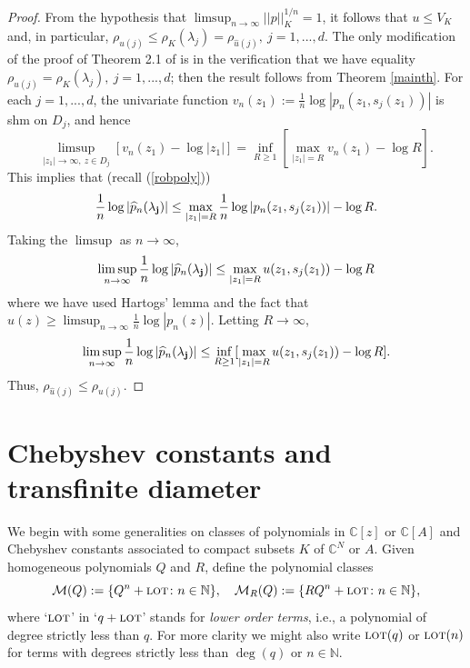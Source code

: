 \documentclass[12pt]{article}
\numberwithin{equation}{section}
\newcommand{\C}{\mathbb{C}}
\newcommand{\N}{\mathbb{N}}
\renewcommand{\hat}{\widehat}
\newcommand{\calM}{\mathcal{M}}
\newcommand{\lot}{\text{\sc lot}}
\begin{document}
\begin{proof} From the hypothesis that $\limsup_{n\to \infty} ||p||_K^{1/n}=1$, it follows that $u\leq V_K$ and, in particular, $\rho_{u(j)}\leq \rho_K(\lambda_j)=\rho_{\hat u(j)}, \ j=1,...,d$. The only modification of the proof of Theorem 2.1 of \cite{B98} is in the verification that we have equality $\rho_{u(j)}= \rho_K(\lambda_j), \ j=1,...,d$; then the result follows from Theorem \ref{mainth}. For each $j=1,...,d$, the univariate function $v_n(z_1):=\frac{1}{n}\log |p_n(z_1,s_j(z_1))|$ is shm on $D_j$, and hence
$$\limsup_{|z_1|\to \infty, \ z\in D_j} [v_n(z_1)-\log |z_1|]=\inf_{R\geq 1}[\max_{|z_1|=R}v_n(z_1)-\log R].$$
This implies that (recall (\ref{robpoly}))
$$\frac{1}{n}\log |\hat p_n({\bf{\lambda_j}})|\leq \max_{|z_1|=R}\frac{1}{n}\log |p_n(z_1,s_j(z_1))|-\log R.$$
Taking the $\limsup$ as $n\to \infty$,   
$$\limsup_{n\to \infty} \frac{1}{n}\log |\hat p_n({\bf{\lambda_j}})|\leq \max_{|z_1|=R} u(z_1,s_j(z_1))-\log R$$
where we have used Hartogs' lemma and the fact that $u(z)\geq \limsup_{n\to \infty}\frac{1}{n}\log |p_n(z)|$. 
Letting $R\to \infty$,
$$\limsup_{n\to \infty} \frac{1}{n}\log |\hat p_n({\bf{\lambda_j}})|\leq \inf_{R\geq 1} [\max_{|z_1|=R} u(z_1,s_j(z_1))-\log R].$$
Thus, $\rho_{\hat u(j)}\leq \rho_{u(j)}$. 


\end{proof}



\section{Chebyshev constants and transfinite diameter}





We begin with some generalities on classes of polynomials in $\C[z]$ or $\C[A]$ and Chebyshev constants associated to compact subsets $K$ of $\C^N$ or $A$. Given homogeneous polynomials $Q$ and $R$, define the polynomial classes 
$$
\calM(Q):= \{ Q^n + \lot\colon n\in \N \},\quad   \calM_R(Q) :=\{ RQ^n+\lot\colon n\in \N\},
$$
where `$\lot$' in `$q+\lot$' stands for \emph{lower order terms}, i.e., a polynomial of degree strictly less than $q$.  For more clarity we might also write $\lot(q)$ or $\lot(n)$ for terms with degrees strictly less than $\deg(q)$ or $n\in \N$.  
\end{document}

